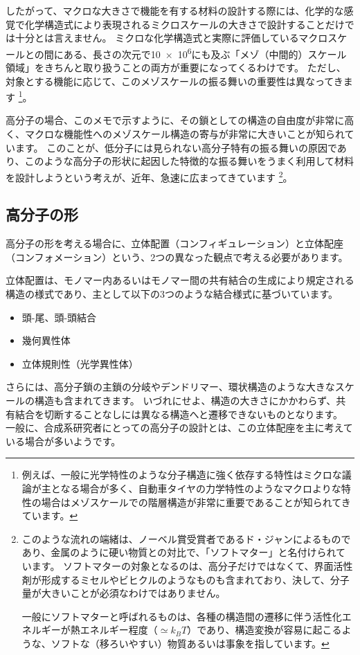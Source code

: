 \documentclass[a4paper,11pt]{ltjsarticle}
\begin{document}
したがって、マクロな大きさで機能を有する材料の設計する際には、化学的な感覚で化学構造式により表現されるミクロスケールの大きさで設計することだけでは十分とは言えません。
ミクロな化学構造式と実際に評価しているマクロスケールとの間にある、長さの次元で\num{10e6}にも及ぶ「メゾ（中間的）スケール領域」をきちんと取り扱うことの両方が重要になってくるわけです。
ただし、対象とする機能に応じて、このメゾスケールの振る舞いの重要性は異なってきます
\footnote
{
例えば、一般に光学特性のような分子構造に強く依存する特性はミクロな議論が主となる場合が多く、自動車タイヤの力学特性のようなマクロよりな特性の場合はメゾスケールでの階層構造が非常に重要であることが知られてきています。
}。

高分子の場合、このメモで示すように、その鎖としての構造の自由度が非常に高く、マクロな機能性へのメゾスケール構造の寄与が非常に大きいことが知られています。
このことが、低分子には見られない高分子特有の振る舞いの原因であり、このような高分子の形状に起因した特徴的な振る舞いをうまく利用して材料を設計しようという考えが、近年、急速に広まってきています
\footnote
{
このような流れの端緒は、ノーベル賞受賞者であるド・ジャンによるものであり、金属のように硬い物質との対比で、「ソフトマター」と名付けられています。
ソフトマターの対象となるのは、高分子だけではなくて、界面活性剤が形成するミセルやビヒクルのようなものも含まれており、決して、分子量が大きいことが必須なわけではありません。

一般にソフトマターと呼ばれるものは、各種の構造間の遷移に伴う活性化エネルギーが熱エネルギー程度（$\simeq k_B T$）であり、構造変換が容易に起こるような、ソフトな（移ろいやすい）物質あるいは事象を指しています。
}。
\subsection{高分子の形}

高分子の形を考える場合に、立体配置（コンフィギュレーション）と立体配座（コンフォメーション）という、2つの異なった観点で考える必要があります。

立体配置は、モノマー内あるいはモノマー間の共有結合の生成により規定される構造の様式であり、主として以下の3つのような結合様式に基づいています。
\begin{itemize}
\item 
頭-尾、頭-頭結合
\item
幾何異性体
\item
立体規則性（光学異性体）
\end{itemize}
さらには、高分子鎖の主鎖の分岐やデンドリマー、環状構造のような大きなスケールの構造も含まれてきます。
いづれにせよ、構造の大きさにかかわらず、共有結合を切断することなしには異なる構造へと遷移できないものとなります。
一般に、合成系研究者にとっての高分子の設計とは、この立体配座を主に考えている場合が多いようです。
\end{document}
